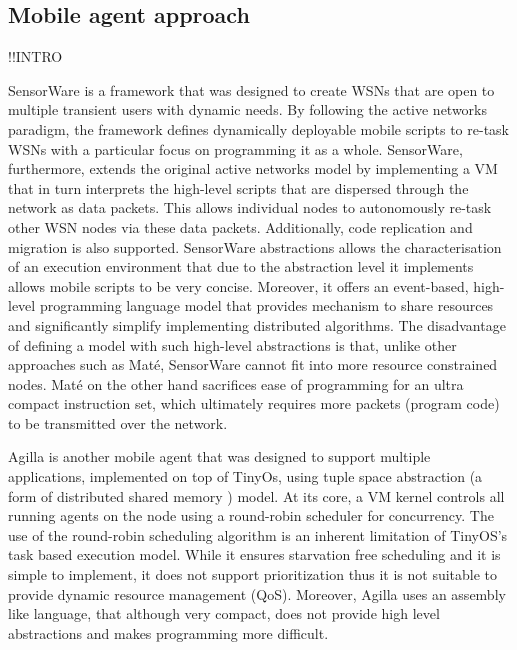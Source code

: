 \subsection{Mobile agent approach}
!!INTRO

SensorWare \cite{Boulis03designand} is a framework that was designed to create WSNs that are open to multiple transient users with dynamic needs. By following the active networks paradigm, the framework defines dynamically deployable mobile scripts to re-task WSNs with a particular focus on programming it as a whole. SensorWare, furthermore, extends the original active networks model by implementing a VM that in turn interprets the high-level scripts that are dispersed through the network as data packets. This allows individual nodes to autonomously re-task other WSN nodes via these data packets. Additionally, code replication and migration is also supported. SensorWare abstractions allows the characterisation of an execution environment that due to the abstraction level it implements allows mobile scripts to be very concise. Moreover, it offers an event-based, high-level programming language model that provides mechanism to share resources and significantly simplify implementing distributed algorithms. The disadvantage of defining a model with such high-level abstractions is that, unlike other approaches such as Maté, SensorWare cannot fit into more resource constrained nodes. Maté on the other hand sacrifices ease of programming for an ultra compact instruction set, which ultimately requires more packets (program code) to be transmitted over the network. 

Agilla is another mobile agent that was designed to support multiple applications, implemented on top of TinyOs, using tuple space abstraction (a form of distributed shared memory \cite{Carriero:1989:LC:63334.63337}) model. At its core, a VM kernel controls all running agents on the node using a round-robin scheduler for concurrency. The use of the round-robin scheduling algorithm is an inherent limitation of TinyOS's task based execution model. While it ensures starvation free scheduling and it is simple to implement, it does not support prioritization thus it is not suitable to provide dynamic resource management (QoS). Moreover, Agilla uses an assembly like language, that although very compact, does not provide high level abstractions and makes programming more difficult. 


